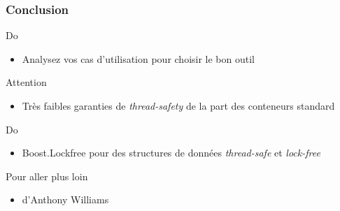\documentclass[C++.tex]{subfiles}
\begin{document}
\begin{frame}[fragile]
	\frametitle{Conclusion}
	\begin{exampleblock}{Do}
		\begin{itemize}
			\item Analysez vos cas d'utilisation pour choisir le bon outil
		\end{itemize}
	\end{exampleblock}

	\begin{alertblock}{Attention}
		\begin{itemize}
			\item Très faibles garanties de \textit{thread-safety} de la part des conteneurs standard
		\end{itemize}

	\end{alertblock}

	\begin{exampleblock}{Do}
		\begin{itemize}
			\item Boost.Lockfree pour des structures de données \textit{thread-safe} et \textit{lock-free}
		\end{itemize}
	\end{exampleblock}

	\begin{block}{Pour aller plus loin}
		\begin{itemize}
			\item \cite{ConcInAction} d'Anthony Williams
		\end{itemize}

	\end{block}
\end{frame}
\end{document}
